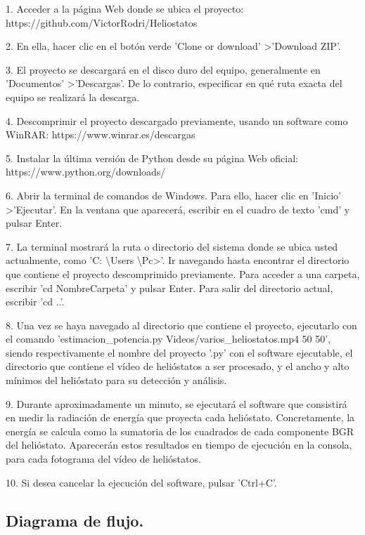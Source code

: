 1. Acceder a la página Web donde se ubica el proyecto: https://github.com/VictorRodri/Heliostatos

2. En ella, hacer clic en el botón verde 'Clone or download' \textgreater 'Download ZIP'.

3. El proyecto se descargará en el disco duro del equipo, generalmente en 'Documentos' \textgreater 'Descargas'. De lo contrario, especificar en qué ruta exacta del equipo se realizará la descarga.

4. Descomprimir el proyecto descargado previamente, usando un software como WinRAR: https://www.winrar.es/descargas

5. Instalar la última versión de Python desde su página Web oficial: https://www.python.org/downloads/

6. Abrir la terminal de comandos de Windows. Para ello, hacer clic en 'Inicio' \textgreater 'Ejecutar'. En la ventana que aparecerá, escribir en el cuadro de texto 'cmd' y pulsar Enter.

7. La terminal mostrará la ruta o directorio del sistema donde se ubica usted actualmente, como 'C: \textbackslash Users \textbackslash Pc\textgreater'. Ir navegando hasta encontrar el directorio que contiene el proyecto descomprimido previamente. Para acceder a una carpeta, escribir 'cd NombreCarpeta' y pulsar Enter. Para salir del directorio actual, escribir 'cd ..'.

8. Una vez se haya navegado al directorio que contiene el proyecto, ejecutarlo con el comando 'estimacion\_potencia.py Videos/varios\_heliostatos.mp4 50 50', siendo respectivamente el nombre del proyecto '.py' con el software ejecutable, el directorio que contiene el vídeo de helióstatos a ser procesado, y el ancho y alto mínimos del helióstato para su detección y análisis.

9. Durante aproximadamente un minuto, se ejecutará el software que consistirá en medir la radiación de energía que proyecta cada helióstato. Concretamente, la energía se calcula como la sumatoria de los cuadrados de cada componente BGR del helióstato. Aparecerán estos resultados en tiempo de ejecución en la consola, para cada fotograma del vídeo de helióstatos.

10. Si desea cancelar la ejecución del software, pulsar 'Ctrl+C'.

\subsection{Diagrama de flujo.}

